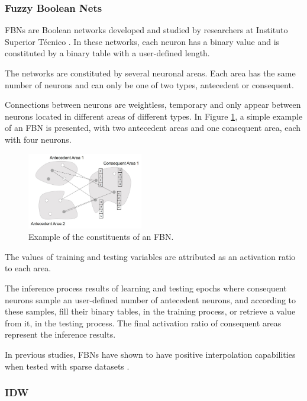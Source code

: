 \subsubsection{Fuzzy Boolean Nets}

FBNs are Boolean networks developed and studied by researchers at Instituto Superior Técnico \cite{Tome}. In these networks, each neuron has a binary value and is constituted by a binary table with a user-defined length. 

The networks are constituted by several neuronal areas. Each area has the same number of neurons and can only be one of two types, antecedent or consequent. 

Connections between neurons are weightless, temporary and only appear between neurons located in different areas of different types. In Figure \ref{fig:fbn-drawing}, a simple example of an FBN is presented, with two antecedent areas and one consequent area, each with four neurons.

\begin{figure}[ht]
\centering
\includegraphics[width=0.45\textwidth]{./Images/fbn-drawing-2.jpg}
\caption{Example of the constituents of an FBN.}
\label{fig:fbn-drawing}
\end{figure}

The values of training and testing variables are attributed as an activation ratio to each area.

The inference process results of learning and testing epochs where consequent neurons sample an user-defined number of antecedent neurons, and according to these samples, fill their binary tables, in the training process, or retrieve a value from it, in the testing process. The final activation ratio of consequent areas represent the inference results. 

In previous studies, FBNs have shown to have positive interpolation capabilities when tested with sparse datasets \cite{Tome2014}.

\subsubsection{IDW}


